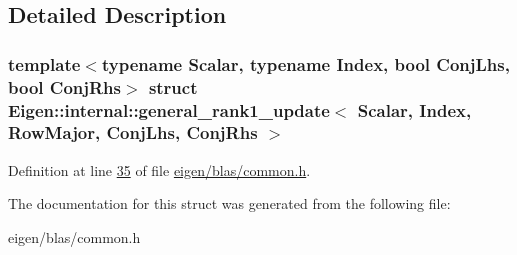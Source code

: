 \subsection{Detailed Description}
\subsubsection*{template$<$typename Scalar, typename Index, bool Conj\+Lhs, bool Conj\+Rhs$>$\newline
struct Eigen\+::internal\+::general\+\_\+rank1\+\_\+update$<$ Scalar, Index, Row\+Major, Conj\+Lhs, Conj\+Rhs $>$}



Definition at line \hyperlink{eigen_2blas_2common_8h_source_l00035}{35} of file \hyperlink{eigen_2blas_2common_8h_source}{eigen/blas/common.\+h}.



The documentation for this struct was generated from the following file\+:\begin{DoxyCompactItemize}
\item 
eigen/blas/common.\+h\end{DoxyCompactItemize}
